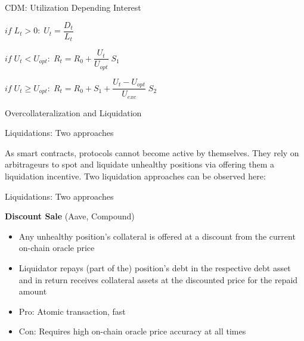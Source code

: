 \documentclass[handout]{beamer}
\begin{document}
\begin{frame}{CDM: Utilization Depending Interest }

$if \;L_t > 0 : \; U_t = \dfrac{D_t}{L_t}$

\vspace{1em}

$if \;  U_t < U_{opt} : \; R_t = R_0 + \dfrac{U_t} {U_{opt}}  \; S_1$

\vspace{1em}

$if \; U_t \geq U_{opt} : \; R_t = R_0 + S_1 + \dfrac{U_t - U_{opt}}{U_{exc}}\; S_2$
	
\end{frame}


\begin{frame}{Overcollateralization and Liquidation}

	
\end{frame}


\begin{frame}{Liquidations: Two approaches }

As smart contracts, protocols cannot become active by themselves. They rely on arbitrageurs to spot and liquidate unhealthy positions via offering them a liquidation incentive. Two  liquidation approaches can be observed here:


	
\end{frame}

\begin{frame}{Liquidations: Two approaches }


\vspace{1em}

\textbf{Discount Sale} (Aave, Compound)

\begin{itemize}
\item Any unhealthy position’s collateral is offered at a discount from the current on-chain oracle price
\item Liquidator repays (part of the) position’s debt in the respective debt asset and in return receives collateral assets at the discounted price for the repaid amount
\item Pro: Atomic transaction, fast
\item Con: Requires high on-chain oracle price accuracy at all times

\end{itemize}

	
\end{frame}
\end{document}
